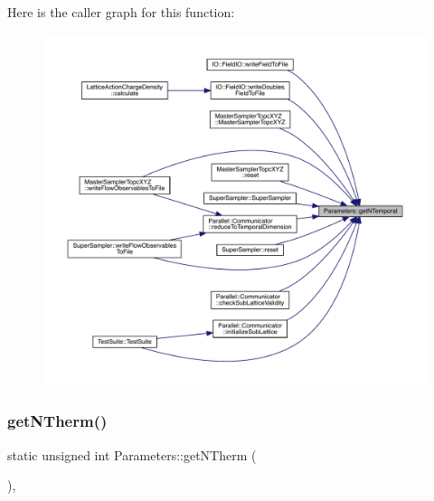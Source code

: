 Here is the caller graph for this function\+:
\nopagebreak
\begin{figure}[H]
\begin{center}
\leavevmode
\includegraphics[width=350pt]{class_parameters_a237ea1286459e8c648e983464829fe8d_icgraph}
\end{center}
\end{figure}
\mbox{\label{class_parameters_ad1f56cc1bb6c19f40454b30a5bc82da6}} 
\subsubsection{\texorpdfstring{getNTherm()}{getNTherm()}}
{\footnotesize\ttfamily static unsigned int Parameters\+::get\+N\+Therm (\begin{DoxyParamCaption}{ }\end{DoxyParamCaption})\hspace{0.3cm}{\ttfamily [inline]}, {\ttfamily [static]}}

